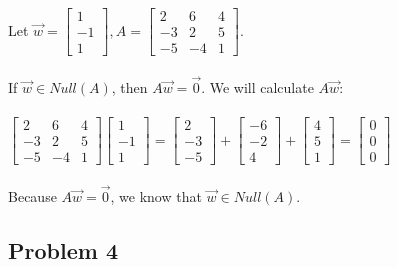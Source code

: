 \documentclass{article}%
\begin{document}
Let
$\vec{w} =
\begin{bmatrix}
    1 \\ -1 \\ 1
\end{bmatrix}, A =
\begin{bmatrix}
    2 & 6 & 4 \\
    -3 & 2 & 5 \\
    -5 & -4 & 1
\end{bmatrix}$.\\
\\
If $\vec{w} \in Null(A)$, then $A\vec{w} = \vec{0}$. We will calculate $A\vec{w}$:\\
\\
$
\begin{bmatrix}
    2 & 6 & 4 \\
    -3 & 2 & 5 \\
    -5 & -4 & 1
\end{bmatrix}
\begin{bmatrix}
    1 \\ -1 \\ 1
\end{bmatrix}
=
\begin{bmatrix}
    2 \\ -3 \\ -5
\end{bmatrix}
+
\begin{bmatrix}
    -6 \\ -2 \\ 4
\end{bmatrix}
+
\begin{bmatrix}
    4 \\ 5 \\ 1
\end{bmatrix}
=
\begin{bmatrix}
    0 \\ 0 \\ 0
\end{bmatrix}$\\
\\
Because $A\vec{w} = \vec{0}$, we know that $\vec{w} \in Null(A)$.

\subsection*{Problem 4}
\end{document}
